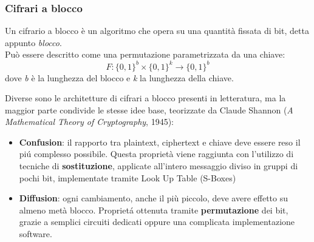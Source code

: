\documentclass[target=bach,aauheader=,style=]{thud}
\begin{document}
            \subsubsection{Cifrari a blocco}
            Un cifrario a blocco è un algoritmo che opera su una quantità fissata di bit, detta appunto \textit{blocco}. \\
            Può essere descritto come una permutazione parametrizzata da una chiave\cite{moderncrypto}:
            \[F:\{0,1\}^b \times \{0,1\}^k \rightarrow \{0,1\}^b\]
            dove \textit{b} è la lunghezza del blocco e \textit{k} la lunghezza della chiave. 

            Diverse sono le architetture di cifrari a blocco presenti in letteratura, ma la maggior parte condivide le stesse idee base, teorizzate da Claude Shannon (\textit{A Mathematical Theory of Cryptography}, 1945):
            \begin{itemize}
                \item \textbf{Confusion}: il rapporto tra plaintext, ciphertext e chiave deve essere reso il piú complesso possibile. Questa proprietà viene raggiunta con l'utilizzo di tecniche di \textbf{sostituzione}, applicate all'intero messaggio diviso in gruppi di pochi bit, implementate tramite Look Up Table (S-Boxes)
                \item \textbf{Diffusion}: ogni cambiamento, anche il più piccolo, deve avere effetto su almeno metà blocco. Proprietá ottenuta tramite \textbf{permutazione} dei bit, grazie a semplici circuiti dedicati oppure una complicata implementazione software.
            \end{itemize}
\end{document}
